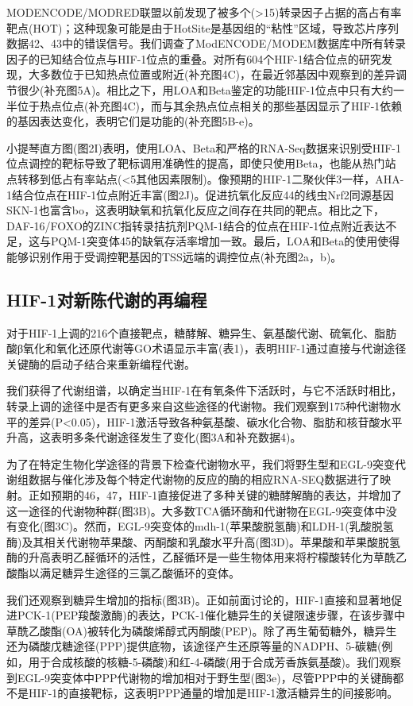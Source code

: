\documentclass{ctexart}
\begin{document}
    MODENCODE/MODRED联盟以前发现了被多个(>15)转录因子占据的高占有率靶点(HOT)；这种现象可能是由于HotSite是基因组的“粘性”区域，导致芯片序列数据42、43中的错误信号。我们调查了ModENCODE/MODEM数据库中所有转录因子的已知结合位点与HIF-1位点的重叠。对所有604个HIF-1结合位点的研究发现，大多数位于已知热点位置或附近(补充图4C)，在最近邻基因中观察到的差异调节很少(补充图5A)。相比之下，用LOA和Beta鉴定的功能HIF-1位点中只有大约一半位于热点位点(补充图4C)，而与其余热点位点相关的那些基因显示了HIF-1依赖的基因表达变化，表明它们是功能的(补充图5B-e)。

    小提琴直方图(图2I)表明，使用LOA、Beta和严格的RNA-Seq数据来识别受HIF-1位点调控的靶标导致了靶标调用准确性的提高，即使只使用Beta，也能从热门站点转移到低占有率站点(<5其他因素限制)。像预期的HIF-1二聚伙伴3一样，AHA-1结合位点在HIF-1位点附近丰富(图2J)。促进抗氧化反应44的线虫Nrf2同源基因SKN-1也富含bo，这表明缺氧和抗氧化反应之间存在共同的靶点。相比之下，DAF-16/FOXO的ZINC指转录拮抗剂PQM-1结合的位点在HIF-1位点附近表达不足，这与PQM-1突变体45的缺氧存活率增加一致。最后，LOA和Beta的使用使得能够识别作用于受调控靶基因的TSS远端的调控位点(补充图2a，b)。

    \subsection{HIF-1对新陈代谢的再编程}

    对于HIF-1上调的216个直接靶点，糖酵解、糖异生、氨基酸代谢、硫氧化、脂肪酸β氧化和氧化还原代谢等GO术语显示丰富(表1)，表明HIF-1通过直接与代谢途径关键酶的启动子结合来重新编程代谢。

    我们获得了代谢组谱，以确定当HIF-1在有氧条件下活跃时，与它不活跃时相比，转录上调的途径中是否有更多来自这些途径的代谢物。我们观察到175种代谢物水平的差异(P<0.05)，HIF-1激活导致各种氨基酸、碳水化合物、脂肪和核苷酸水平升高，这表明多条代谢途径发生了变化(图3A和补充数据4)。

    为了在特定生物化学途径的背景下检查代谢物水平，我们将野生型和EGL-9突变代谢组数据与催化涉及每个特定代谢物的反应的酶的相应RNA-SEQ数据进行了映射。正如预期的46，47，HIF-1直接促进了多种关键的糖酵解酶的表达，并增加了这一途径的代谢物种群(图3B)。大多数TCA循环酶和代谢物在EGL-9突变体中没有变化(图3C)。然而，EGL-9突变体的mdh-1(苹果酸脱氢酶)和LDH-1(乳酸脱氢酶)及其相关代谢物苹果酸、丙酮酸和乳酸水平升高(图3D)。苹果酸和苹果酸脱氢酶的升高表明乙醛循环的活性，乙醛循环是一些生物体用来将柠檬酸转化为草酰乙酸酯以满足糖异生途径的三氯乙酸循环的变体。

    我们还观察到糖异生增加的指标(图3B)。正如前面讨论的，HIF-1直接和显著地促进PCK-1(PEP羧酸激酶)的表达，PCK-1催化糖异生的关键限速步骤，在该步骤中草酰乙酸酯(OA)被转化为磷酸烯醇式丙酮酸(PEP)。除了再生葡萄糖外，糖异生还为磷酸戊糖途径(PPP)提供底物，该途径产生还原等量的NADPH、5-碳糖(例如，用于合成核酸的核糖-5-磷酸)和红-4-磷酸(用于合成芳香族氨基酸)。我们观察到EGL-9突变体中PPP代谢物的增加相对于野生型(图3e)，尽管PPP中的关键酶都不是HIF-1的直接靶标，这表明PPP通量的增加是HIF-1激活糖异生的间接影响。
\end{document}
